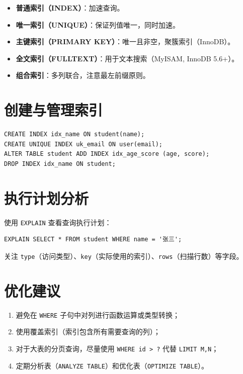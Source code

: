 \documentclass[12pt,UTF8]{ctexbook}
\begin{document}
\begin{itemize}
  \item \textbf{普通索引（INDEX）}：加速查询。
  \item \textbf{唯一索引（UNIQUE）}：保证列值唯一，同时加速。
  \item \textbf{主键索引（PRIMARY KEY）}：唯一且非空，聚簇索引（InnoDB）。
  \item \textbf{全文索引（FULLTEXT）}：用于文本搜索（MyISAM, InnoDB 5.6+）。
  \item \textbf{组合索引}：多列联合，注意最左前缀原则。
\end{itemize}

\section{创建与管理索引}

\begin{lstlisting}
CREATE INDEX idx_name ON student(name);
CREATE UNIQUE INDEX uk_email ON user(email);
ALTER TABLE student ADD INDEX idx_age_score (age, score);
DROP INDEX idx_name ON student;
\end{lstlisting}

\section{执行计划分析}

使用 \texttt{EXPLAIN} 查看查询执行计划：
\begin{lstlisting}
EXPLAIN SELECT * FROM student WHERE name = '张三';
\end{lstlisting}
关注 \texttt{type}（访问类型）、\texttt{key}（实际使用的索引）、\texttt{rows}（扫描行数）等字段。

\section{优化建议}

\begin{enumerate}
  \item 避免在 \texttt{WHERE} 子句中对列进行函数运算或类型转换；
  \item 使用覆盖索引（索引包含所有需要查询的列）；
  \item 对于大表的分页查询，尽量使用 \texttt{WHERE id > ?} 代替 \texttt{LIMIT M,N}；
  \item 定期分析表（\texttt{ANALYZE TABLE}）和优化表（\texttt{OPTIMIZE TABLE}）。
\end{enumerate}
\end{document}

